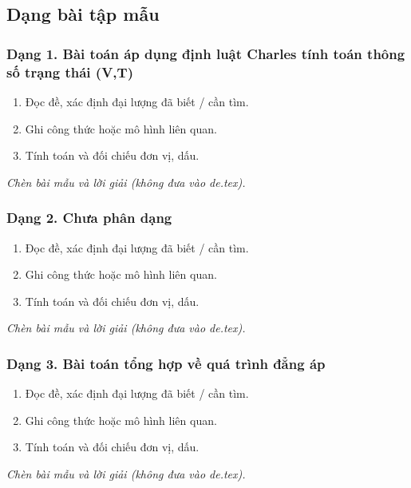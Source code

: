 

\subsection{Dạng bài tập mẫu}
\subsubsection{Dạng 1. Bài toán áp dụng định luật Charles tính toán thông số trạng thái (V,T)}
\begin{phuongphap}
\begin{enumerate}
\item Đọc đề, xác định đại lượng đã biết / cần tìm.
\item Ghi công thức hoặc mô hình liên quan.
\item Tính toán và đối chiếu đơn vị, dấu.
\end{enumerate}
\end{phuongphap}
\begin{vidumau}
\textit{Chèn bài mẫu và lời giải (không đưa vào de.tex).}
\end{vidumau}

\subsubsection{Dạng 2. Chưa phân dạng}
\begin{phuongphap}
\begin{enumerate}
\item Đọc đề, xác định đại lượng đã biết / cần tìm.
\item Ghi công thức hoặc mô hình liên quan.
\item Tính toán và đối chiếu đơn vị, dấu.
\end{enumerate}
\end{phuongphap}
\begin{vidumau}
\textit{Chèn bài mẫu và lời giải (không đưa vào de.tex).}
\end{vidumau}

\subsubsection{Dạng 3. Bài toán tổng hợp về quá trình đẳng áp}
\begin{phuongphap}
\begin{enumerate}
\item Đọc đề, xác định đại lượng đã biết / cần tìm.
\item Ghi công thức hoặc mô hình liên quan.
\item Tính toán và đối chiếu đơn vị, dấu.
\end{enumerate}
\end{phuongphap}
\begin{vidumau}
\textit{Chèn bài mẫu và lời giải (không đưa vào de.tex).}
\end{vidumau}

